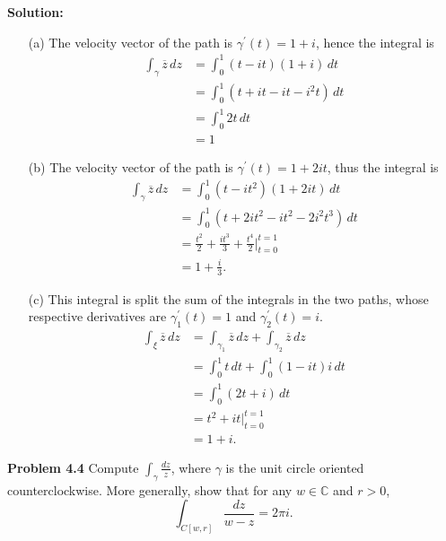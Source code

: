 \documentclass[12pt,oneside]{exam}
\newenvironment{exercise}[1]{\vspace{.1in}\noindent\textbf{Problem #1 \hspace{.05em}}}{}
\begin{document}
\vspace{0.5cm}
\noindent \textbf{Solution:} 
\begin{itemize}
\item[(a)] The velocity vector of the path is $\gamma^{'}(t)=1+i$, hence the integral is 
\begin{align*}
\int_{\gamma} \overline{z} \, dz & = \int_{0}^{1} (t-it)(1+i) \, dt \\
& = \int_{0}^{1}(t+it-it-i^2t) \, dt \\
& = \int_{0}^{1} 2t \, dt\\
& = 1
\end{align*}
\item[(b)] The velocity vector of the path is $\gamma^{'}(t) = 1 + 2it$, thus the integral is 
\begin{align*}
\int_{\gamma} \overline{z} \, dz & = \int_{0}^{1} (t-it^2)(1+2it) \, dt \\
& = \int_{0}^{1} (t+2it^2-it^2-2i^2t^3) \, dt \\
& = \frac{t^2}{2} + \frac{it^3}{3}+\frac{t^4}{2} \Big|_{t=0}^{t=1} \\
& = 1+\frac{i}{3}.
\end{align*}
\item[(c)] This integral is split the sum of the integrals in the two paths, whose respective derivatives are $\gamma_{1}^{'}(t) = 1$ and $\gamma_{2}^{'}(t) = i$. 
\begin{align*}
\int_{\xi} \overline{z} \, dz & = \int_{\gamma_{1}} \overline{z} \, dz  + \int_{\gamma_{2}} \overline{z} \, dz \\
& = \int_{0}^{1} t \, dt + \int_{0}^{1} (1-it)i \, dt \\
& = \int_{0}^{1} (2t+i) \, dt \\
& = t^2+it \Big|_{t=0}^{t=1} \\
& = 1+i.
\end{align*}
\end{itemize}

\vspace{1cm}

\begin{exercise}{4.4}
Compute $\int_{\gamma} \frac{dz}{z}$, where $\gamma$ is the unit circle oriented counterclockwise. More generally, show that for any $w \in \mathbb{C}$ and $r>0$, 
\begin{equation*}
\int_{C[w,r]} \frac{dz}{w-z} = 2\pi i.
\end{equation*}
\end{exercise}
\end{document}
